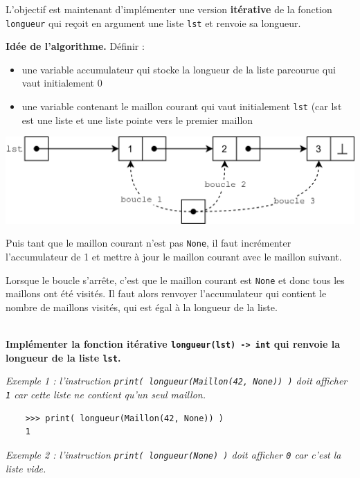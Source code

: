 \documentclass[a4paper,17pt]{extarticle}
\let\origfigure\figure
\let\endorigfigure\endfigure
\renewenvironment{figure}[1][2] {
    \expandafter\origfigure\expandafter[H]
} {
    \endorigfigure
}
\newenvironment{eleve}%
{\begin{activite}\color{noiramu}\\[-0.5cm]}
{\end{activite}}
\providecommand{\tightlist}{%
      \setlength{\itemsep}{0pt}\setlength{\parskip}{0pt}}
\begin{document}
    L'objectif est maintenant d'implémenter une version \textbf{itérative}
de la fonction \texttt{longueur} qui reçoit en argument une liste
\texttt{lst} et renvoie sa longueur.
\begin{retenir}
    \textbf{Idée de l'algorithme.} Définir :

\begin{itemize}
\tightlist
\item
  une variable accumulateur qui stocke la longueur de la liste parcourue
  qui vaut initialement 0
\item
  une variable contenant le maillon courant qui vaut initialement
  \texttt{lst} (car lst est une liste et une liste pointe vers le
  premier maillon
\end{itemize}

\begin{figure}
\centering
\includegraphics{maillon3.png}
\caption{algo récursif}
\end{figure}

Puis tant que le maillon courant n'est pas \texttt{None}, il faut
incrémenter l'accumulateur de 1 et mettre à jour le maillon courant avec
le maillon suivant.

Lorsque le boucle s'arrête, c'est que le maillon courant est
\texttt{None} et donc tous les maillons ont été visités. Il faut alors
renvoyer l'accumulateur qui contient le nombre de maillons visités, qui
est égal à la longueur de la liste.

        \end{retenir}\begin{eleve}
    \textbf{Implémenter la fonction itérative
\texttt{longueur(lst)\ -\textgreater{}\ int} qui renvoie la longueur de
la liste \texttt{lst}.}

\emph{Exemple 1 : l'instruction
\texttt{print(\ longueur(Maillon(42,\ None))\ )} doit afficher
\texttt{1} car cette liste ne contient qu'un seul maillon.}

\begin{verbatim}
    >>> print( longueur(Maillon(42, None)) )
    1
\end{verbatim}

\emph{Exemple 2 : l'instruction \texttt{print(\ longueur(None)\ )} doit
afficher \texttt{0} car c'est la liste vide.}


\end{eleve}
\end{document}
